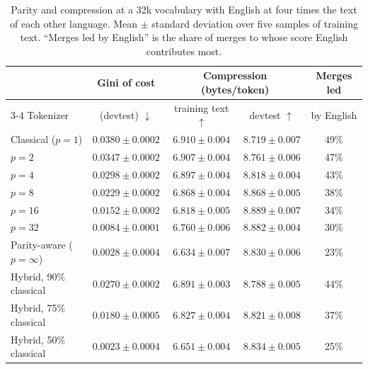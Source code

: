 \documentclass[11pt,a4paper]{article}
\theoremstyle{remark}
\begin{document}
\begin{table}[t]
\centering
\caption{Parity and compression at a 32k vocabulary with English at four times the text of
each other language. Mean $\pm$ standard deviation over five samples of training text.
``Merges led by English'' is the share of merges to whose score English contributes most.}
\label{tab:front}
\begin{tabular}{lcccc}
\toprule
 & Gini of cost & \multicolumn{2}{c}{Compression (bytes/token)} & Merges led\\
\cmidrule(lr){3-4}
Tokenizer & (devtest) $\downarrow$ & training text $\uparrow$ & devtest $\uparrow$ & by English\\
\midrule
Classical ($p=1$) & $0.0380\pm0.0002$ & $6.910\pm0.004$ & $8.719\pm0.007$ & 49\%\\
$p=2$  & $0.0347\pm0.0002$ & $6.907\pm0.004$ & $8.761\pm0.006$ & 47\%\\
$p=4$  & $0.0298\pm0.0002$ & $6.897\pm0.004$ & $8.818\pm0.004$ & 43\%\\
$p=8$  & $0.0229\pm0.0002$ & $6.868\pm0.004$ & $8.868\pm0.005$ & 38\%\\
$p=16$ & $0.0152\pm0.0002$ & $6.818\pm0.005$ & $8.889\pm0.007$ & 34\%\\
$p=32$ & $0.0084\pm0.0001$ & $6.760\pm0.006$ & $8.882\pm0.004$ & 30\%\\
Parity-aware ($p=\infty$) & $0.0028\pm0.0004$ & $6.634\pm0.007$ & $8.830\pm0.006$ & 23\%\\
\midrule
Hybrid, 90\% classical & $0.0270\pm0.0002$ & $6.891\pm0.003$ & $8.788\pm0.005$ & 44\%\\
Hybrid, 75\% classical & $0.0180\pm0.0005$ & $6.827\pm0.004$ & $8.821\pm0.008$ & 37\%\\
Hybrid, 50\% classical & $0.0023\pm0.0004$ & $6.651\pm0.004$ & $8.834\pm0.005$ & 25\%\\
\bottomrule
\end{tabular}
\end{table}
\end{document}
